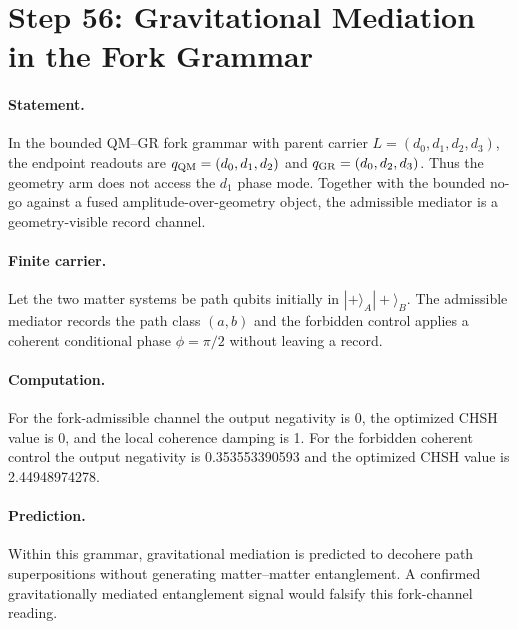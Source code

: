 \section*{Step 56: Gravitational Mediation in the Fork Grammar}

\paragraph{Statement.}
In the bounded QM--GR fork grammar with parent carrier
$L=(d_0,d_1,d_2,d_3)$, the endpoint readouts are
$q_{\rm QM}=(d_0,d_1,d_2)$ and $q_{\rm GR}=(d_0,d_2,d_3)$.
Thus the geometry arm does not access the $d_1$ phase mode. Together
with the bounded no-go against a fused amplitude-over-geometry object,
the admissible mediator is a geometry-visible record channel.

\paragraph{Finite carrier.}
Let the two matter systems be path qubits initially in
$|+\rangle_A|+\rangle_B$. The admissible mediator records the path
class $(a,b)$ and the forbidden control applies a coherent conditional
phase $\phi=\pi/2$ without leaving a record.

\paragraph{Computation.}
For the fork-admissible channel the output negativity is
0, the optimized CHSH value is
0, and the local coherence damping is
1. For the forbidden
coherent control the output negativity is 0.353553390593
and the optimized CHSH value is 2.44948974278.

\paragraph{Prediction.}
Within this grammar, gravitational mediation is predicted to decohere
path superpositions without generating matter--matter entanglement.
A confirmed gravitationally mediated entanglement signal would falsify
this fork-channel reading.
